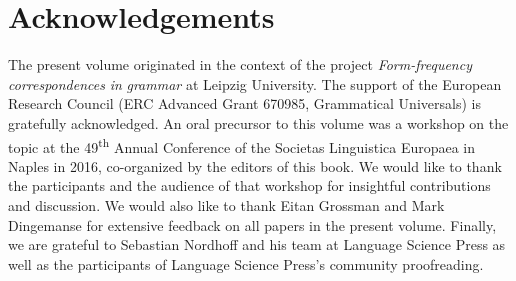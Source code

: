 \documentclass[output=paper]{langsci/langscibook}
\begin{document}
\section*{Acknowledgements}

The present volume originated in the context of the project \textit{Form-frequency} \textit{correspondences} \textit{in} \textit{grammar} at Leipzig University. The support of the European Research Council (ERC Advanced Grant 670985, Grammatical Universals) is gratefully acknowledged. An oral precursor to this volume was a workshop on the topic at the 49\textsuperscript{th} Annual Conference of the Societas Linguistica Europaea in Naples in 2016, co-organized by the editors of this book. We would like to thank the participants and the audience of that workshop for insightful contributions and discussion. We would also like to thank Eitan Grossman and Mark Dingemanse for extensive feedback on all papers in the present volume. Finally, we are grateful to Sebastian Nordhoff and his team at Language Science Press as well as the participants of Language Science Press’s community proofreading.

 
\end{document}
